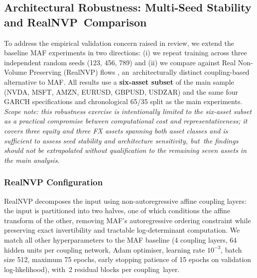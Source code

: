 \documentclass[risks,article,accept,pdftex,moreauthors]{Definitions/mdpi}
\begin{document}
\subsection{Architectural Robustness: Multi-Seed Stability and RealNVP~Comparison}
\label{sec:robustness}

To address the empirical validation concern raised in review, we extend the baseline MAF experiments in two directions: (i) we repeat training across three independent random seeds (123, 456, 789) and (ii) we compare against Real Non-Volume Preserving (RealNVP) flows \citep{dinh2016density}, an~architecturally distinct coupling-based alternative to MAF. All results use a \textbf{six-asset subset} of the main sample (NVDA, MSFT, AMZN, EURUSD, GBPUSD, USDZAR) and the same four GARCH specifications and chronological 65/35 split as the main experiments. \textit{Scope note: this robustness exercise is intentionally limited to the six-asset subset as a practical compromise between computational cost and representativeness; it covers three equity and three FX assets spanning both asset classes and is sufficient to assess seed stability and architecture sensitivity, but~the findings should not be extrapolated without qualification to the remaining seven assets in the main analysis.}

\subsubsection{{RealNVP} %
 Configuration} 
RealNVP decomposes the input using non-autoregressive affine coupling layers: the input is partitioned into two halves, one of which conditions the affine transform of the other, removing MAF's autoregressive ordering constraint while preserving exact invertibility and tractable log-determinant computation. We match all other hyperparameters to the MAF baseline (4 coupling layers, 64 hidden units per coupling network, Adam optimiser, learning rate $10^{-3}$, batch size 512, maximum 75 epochs, early stopping patience of 15 epochs on validation log-likelihood), with~2 residual blocks per coupling~layer.
\end{document}
